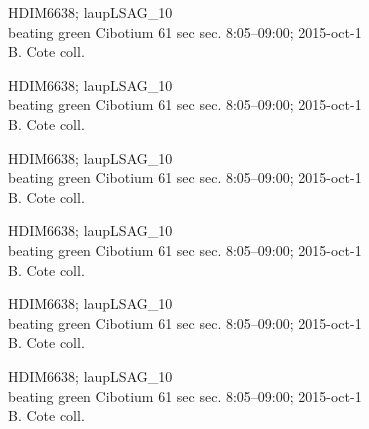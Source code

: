 \documentclass[2pt]{extarticle}
\begin{document}
\noindent
\parbox{0.16\textwidth}{\tiny \raggedright \rule[-0.3\baselineskip]{0pt}{10pt}HDIM6638; laupLSAG\_10\\ beating green Cibotium 61 sec sec. 8:05--09:00; 2015-oct-1\\ B. Cote coll.}
\parbox{0.16\textwidth}{\tiny \raggedright \rule[-0.3\baselineskip]{0pt}{10pt}HDIM6638; laupLSAG\_10\\ beating green Cibotium 61 sec sec. 8:05--09:00; 2015-oct-1\\ B. Cote coll.}
\parbox{0.16\textwidth}{\tiny \raggedright \rule[-0.3\baselineskip]{0pt}{10pt}HDIM6638; laupLSAG\_10\\ beating green Cibotium 61 sec sec. 8:05--09:00; 2015-oct-1\\ B. Cote coll.}
\parbox{0.16\textwidth}{\tiny \raggedright \rule[-0.3\baselineskip]{0pt}{10pt}HDIM6638; laupLSAG\_10\\ beating green Cibotium 61 sec sec. 8:05--09:00; 2015-oct-1\\ B. Cote coll.}
\parbox{0.16\textwidth}{\tiny \raggedright \rule[-0.3\baselineskip]{0pt}{10pt}HDIM6638; laupLSAG\_10\\ beating green Cibotium 61 sec sec. 8:05--09:00; 2015-oct-1\\ B. Cote coll.}
\parbox{0.16\textwidth}{\tiny \raggedright \rule[-0.3\baselineskip]{0pt}{10pt}HDIM6638; laupLSAG\_10\\ beating green Cibotium 61 sec sec. 8:05--09:00; 2015-oct-1\\ B. Cote coll.} \\ 
\vspace{0.001in} 
\end{document}

